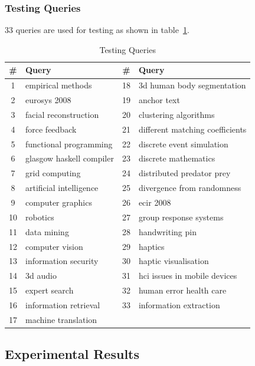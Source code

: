 \subsubsection{Testing Queries}
33 queries are used for testing as shown in table~\ref{table:testingqueries}.
\begin{table}
\centering
\begin{tabular}{|c|l|c|l|}
\hline \textbf{\#} & \textbf{Query} & \textbf{\#} & \textbf{Query} \\
\hline 1 & empirical methods & 18 & 3d human body segmentation\\
\hline 2 & eurosys 2008 & 19 & anchor text \\
\hline 3  & facial reconstruction & 20 & clustering algorithms\\ 
\hline 4  & force feedback & 21 & different matching coefficients\\ 
\hline 5  & functional programming & 22 & discrete event simulation\\ 
\hline 6  & glasgow haskell compiler & 23 & discrete mathematics\\ 
\hline 7  & grid computing & 24 & distributed predator prey\\ 
\hline 8  & artificial intelligence & 25 & divergence from randomness\\ 
\hline 9  & computer graphics & 26 & ecir 2008 \\
\hline 10  & robotics & 27 & group response systems\\ 
\hline 11  & data mining & 28 & handwriting pin\\ 
\hline 12  & computer vision & 29 & haptics\\ 
\hline 13  & information security & 30 & haptic visualisation\\ 
\hline 14  & 3d audio & 31 & hci issues in mobile devices\\ 
\hline 15  & expert search & 32 & human error health care \\ 
\hline 16  & information retrieval & 33 & information extraction\\ 
\hline 17  & machine translation &  & \\ 
\hline
\end{tabular}
\caption{Testing Queries} \label{table:testingqueries}
\end{table}

\subsection{Experimental Results}

